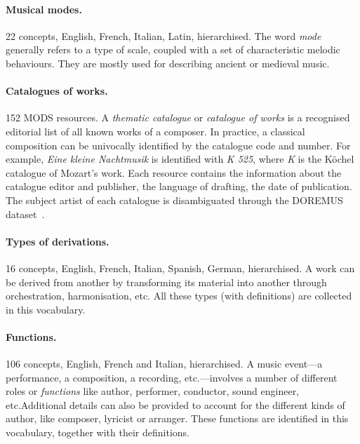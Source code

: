\documentclass{article}
\newcommand{\etc}{etc.}
\begin{document}
\vspace{-\baselineskip}
\paragraph*{Musical modes.} 22 concepts, English, French, Italian, Latin, hierarchised.
The word \textit{mode} generally refers to a type of scale, coupled with a set of characteristic melodic behaviours. They are mostly used for describing ancient or medieval music.

\vspace{-\baselineskip}
\paragraph*{Catalogues of works.} 152 MODS resources.
A \textit{thematic catalogue} or \textit{catalogue of works} is a recognised editorial list of all known works of a composer. In practice, a classical composition can be univocally identified by the catalogue code and number. For example, \textit{Eine kleine Nachtmusik} is identified with \textit{K 525}, where \textit{K} is the K\"{o}chel catalogue of Mozart's work. Each resource contains the information about the catalogue editor and publisher, the language of drafting, the date of publication. The subject artist of each catalogue is disambiguated through the DOREMUS dataset~\cite{lisena2017modeling, doremusGraph}.

\vspace{-\baselineskip}
\paragraph*{Types of derivations.} 16 concepts, English, French, Italian, Spanish, German, hierarchised.
A work can be derived from another by transforming its material into another through orchestration, harmonisation, etc. All these types (with definitions) are collected in this vocabulary.

\vspace{-\baselineskip}
\paragraph*{Functions.} 106 concepts, English, French and Italian, hierarchised.
A music event---a performance, a composition, a recording, etc.---involves a number of different roles or \textit{functions} like author, performer, conductor, sound engineer, \etc Additional details can also be provided to account for the different kinds of author, like composer, lyricist or arranger. These functions are identified in this vocabulary, together with their definitions.
\end{document}
